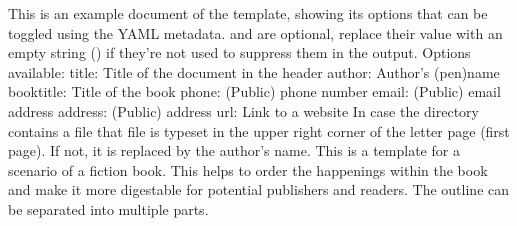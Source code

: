 \markdownRendererDocumentBegin
\markdownRendererJekyllDataBegin{}\markdownRendererJekyllDataMappingEnd\markdownRendererJekyllDataEnd\markdownRendererInterblockSeparator
{}This is an example document of the template, showing its options that can be toggled using the YAML metadata.  and  are optional, replace their value with an empty string () if they're not used to suppress them in the output.\markdownRendererInterblockSeparator
{}Options available:\markdownRendererInterblockSeparator
{}\markdownRendererUlBeginTight
\markdownRendererUlItem title: Title of the document in the header\markdownRendererUlItemEnd 
\markdownRendererUlItem author: Author's (pen)name\markdownRendererUlItemEnd 
\markdownRendererUlItem booktitle: Title of the book\markdownRendererUlItemEnd 
\markdownRendererUlItem phone: (Public) phone number\markdownRendererUlItemEnd 
\markdownRendererUlItem email: (Public) email address\markdownRendererUlItemEnd 
\markdownRendererUlItem address: (Public) address\markdownRendererUlItemEnd 
\markdownRendererUlItem url: Link to a website\markdownRendererUlItemEnd 
\markdownRendererUlEndTight \markdownRendererInterblockSeparator
{}In case the  directory contains a  file that file is typeset in the upper right corner of the letter page (first page). If not, it is replaced by the author's name.\markdownRendererInterblockSeparator
{}\markdownRendererInterblockSeparator
{}This is a template for a scenario of a fiction book. This helps to order the happenings within the book and make it more digestable for potential publishers and readers.\markdownRendererInterblockSeparator
{}\markdownRendererHorizontalRule{}\markdownRendererInterblockSeparator
{}\markdownRendererInterblockSeparator
{}The outline can be separated into multiple parts.\markdownRendererDocumentEnd